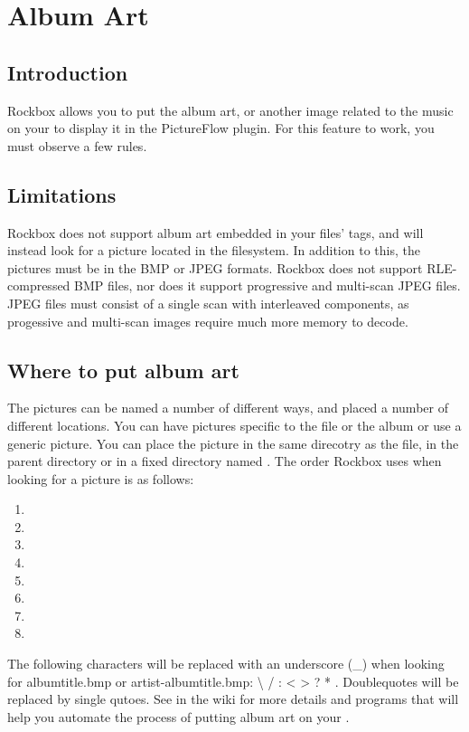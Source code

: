 \chapter{\label{ref:album_art}Album Art}
\section{Introduction}

Rockbox allows you to put the album art, or another image related to the music
on your \dap to display it in the PictureFlow plugin. For this feature to work, you must observe a few rules.

\section{Limitations}

Rockbox does not support album art embedded in your files' tags, and will
instead look for a picture located in the filesystem. In addition to this, the
pictures must be in the BMP or JPEG formats. Rockbox does not support
RLE-compressed BMP files, nor does it support progressive and multi-scan
JPEG files. JPEG files must consist of a single scan with interleaved components, 
as progessive and multi-scan images require much more memory to decode.

\section{Where to put album art}

The pictures can be named a number of different ways, and placed a number of
different locations. You can have pictures specific to the file or the album
or use a generic picture. You can place the picture in the same direcotry
as the file, in the parent directory or in a fixed directory named
. The order Rockbox uses when looking for a picture
is as follows:

\begin{enumerate}
\item  {}
\item  {}
\item  {}
\item  {}
\item  {}
\item  {}
\item  {}
\item  {}
\end{enumerate}

The following characters will be replaced with an underscore (\_) when looking
for albumtitle.bmp or artist-albumtitle.bmp: \textbackslash{} / : \textless{}
\textgreater{} ? * \textbar{}. Doublequotes will be replaced by single qutoes.
See  in the wiki for more details and programs that will
help you automate the process of putting album art on your \dap{}.
